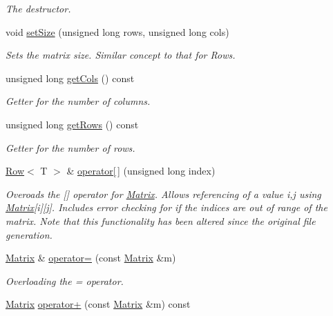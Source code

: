\begin{DoxyCompactItemize}
\begin{DoxyCompactList}\small\item\em The destructor. \end{DoxyCompactList}\item 
void \hyperlink{class_matrix_aa393296d4132d7aafc4e236ddfe59f06}{set\+Size} (unsigned long rows, unsigned long cols)
\begin{DoxyCompactList}\small\item\em Sets the matrix size. Similar concept to that for Rows. \end{DoxyCompactList}\item 
unsigned long \hyperlink{class_matrix_a9b4ce445c65dcea66c66dda875cc39d8}{get\+Cols} () const 
\begin{DoxyCompactList}\small\item\em Getter for the number of columns. \end{DoxyCompactList}\item 
unsigned long \hyperlink{class_matrix_a442879db6473eeab202928dc47992206}{get\+Rows} () const 
\begin{DoxyCompactList}\small\item\em Getter for the number of rows. \end{DoxyCompactList}\item 
\hyperlink{class_row}{Row}$<$ T $>$ \& \hyperlink{class_matrix_ae7e14b4bd8bb570260a4e578e4a601b7}{operator\mbox{[}$\,$\mbox{]}} (unsigned long index)
\begin{DoxyCompactList}\small\item\em Overoads the \mbox{[}\mbox{]} operator for \hyperlink{class_matrix}{Matrix}. Allows referencing of a value i,j using \hyperlink{class_matrix}{Matrix}\mbox{[}i\mbox{]}\mbox{[}j\mbox{]}. Includes error checking for if the indices are out of range of the matrix. Note that this functionality has been altered since the original file generation. \end{DoxyCompactList}\item 
\hyperlink{class_matrix}{Matrix} \& \hyperlink{class_matrix_a94508f84ba0d62e81aa8d508aa43f1ec}{operator=} (const \hyperlink{class_matrix}{Matrix} \&m)
\begin{DoxyCompactList}\small\item\em Overloading the = operator. \end{DoxyCompactList}\item 
\hyperlink{class_matrix}{Matrix} \hyperlink{class_matrix_abdbd1bbdae2f6926cdc2b58faa304826}{operator+} (const \hyperlink{class_matrix}{Matrix} \&m) const 

\end{DoxyCompactItemize}
